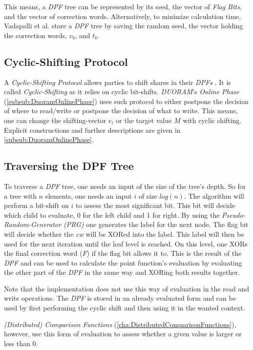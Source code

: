 This means, a \textit{DPF} tree can be represented by its seed, the vector of \textit{Flag Bits}, and the vector of correction words.
Alternatively, to minimize calculation time, Vadapalli et al. \cite{vadapalli2023duoram} store a \textit{DPF} tree by saving the random seed, the vector holding the correction words, $v_b$, and $t_b$.

\subsection{Cyclic-Shifting Protocol}
\label{sub:CyclicShiftingProtocol}
A \textit{Cyclic-Shifting Protocol} allows parties to shift shares in their \textit{DPFs} \cite{vadapalli2023duoram}.
It is called \textit{Cyclic-Shifting} as it relies on cyclic bit-shifts.
\textit{DUORAM}'s \textit{Online Phase} (\ref{subsub:DuoramOnlinePhase}) uses such protocol to either postpone the decision of where to read/write or postpone the decision of what to write.
This means, one can change the shifting-vector $e_i$ or the target value $M$ with cyclic shifting.
Explicit constructions and further descriptions are given in \ref{subsub:DuoramOnlinePhase}.

\subsection{Traversing the DPF Tree}
\label{sub:TraversingTheDPFTree}
To traverse a \textit{DPF} tree, one needs an input of the size of the tree's depth.
So for a tree with $n$ elements, one needs an input $i$ of size $log(n)$.
The algorithm will perform a bit-shift on $i$ to assess the most significant bit.
This bit will decide which child to evaluate, 0 for the left child and 1 for right.
By using the \textit{Pseudo-Random-Generator (PRG)} one generates the label for the next node.
The flag bit will decide whether the \textit{cw} will be XORed into the label.
This label will then be used for the next iteration until the leaf level is reached.
On this level, one XORs the final correction word ($F$) if the flag bit allows it to.
This is the result of the \textit{DPF} and can be used to calculate the point function's evaluation by evaluating the other part of the \textit{DPF} in the same way and XORing both results together.

Note that the implementation does not use this way of evaluation in the read and write operations.
The \textit{DPF} is stored in an already evaluated form and can be used by first performing the cyclic shift and then using it in the wanted context.

\textit{(Distributed) Comparison Functions} (\ref{cha:DistributedComparisonFunctions}), however, use this form of evaluation to assess whether a given value is larger or less than $0$.